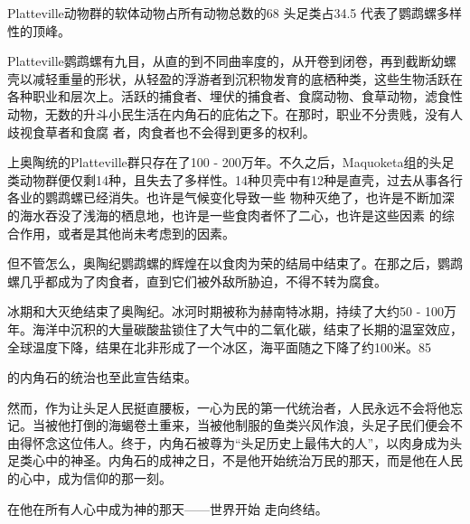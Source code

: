 \documentclass{article}
\begin{document}
Platteville动物群的软体动物占所有动物总数的68%
\newpage
头足类占34.5%
代表了鹦鹉螺多样性的顶峰。 

Platteville鹦鹉螺有九目，从直的到不同曲率度的，从开卷到闭卷，再到截断幼螺壳以减轻重量的形状，从轻盈的浮游者到沉积物发育的底栖种类，这些生物活跃在各种职业和层次上。活跃的捕食者、埋伏的捕食者、食腐动物、食草动物，滤食性动物，无数的升斗小民生活在内角石的庇佑之下。在那时，职业不分贵贱，没有人歧视食草者和食腐
者，肉食者也不会得到更多的权利。 

上奥陶统的Platteville群只存在了100 - 200万年。不久之后，Maquoketa组的头足类动物群便仅剩14种，且失去了多样性。14种贝壳中有12种是直壳，过去从事各行各业的鹦鹉螺已经消失。也许是气候变化导致一些
\newpage
物种灭绝了，也许是不断加深的海水吞没了浅海的栖息地，也许是一些食肉者怀了二心，也许是这些因素
的综合作用，或者是其他尚未考虑到的因素。 

但不管怎么，奥陶纪鹦鹉螺的辉煌在以食肉为荣的结局中结束了。在那之后，鹦鹉螺几乎都成为了肉食者，直到它们被外敌所胁迫，不得不转为腐食。
 

冰期和大灭绝结束了奥陶纪。冰河时期被称为赫南特冰期，持续了大约50 - 100万年。海洋中沉积的大量碳酸盐锁住了大气中的二氧化碳，结束了长期的温室效应，全球温度下降，结果在北非形成了一个冰区，海平面随之下降了约100米。85%

\newpage
的内角石的统治也至此宣告结束。 

然而，作为让头足人民挺直腰板，一心为民的第一代统治者，人民永远不会将他忘记。当被他打倒的海蝎卷土重来，当被他制服的鱼类兴风作浪，头足子民们便会不由得怀念这位伟人。终于，内角石被尊为“头足历史上最伟大的人”，以肉身成为头足类心中的神圣。内角石的成神之日，不是他开始统治万民的那天，而是他在人民的心中，成为信仰的那一刻。

在他在所有人心中成为神的那天——世界开始
走向终结。 
\end{document}
